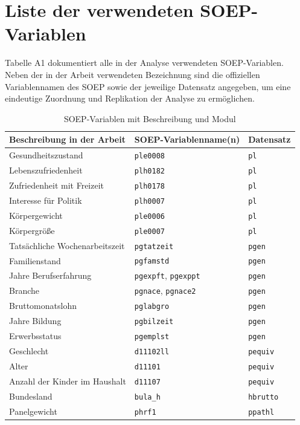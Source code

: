 
\section{Liste der verwendeten SOEP-Variablen}
Tabelle A1 dokumentiert alle in der Analyse verwendeten SOEP-Variablen. Neben der in der Arbeit verwendeten Bezeichnung sind die offiziellen Variablennamen des SOEP sowie der jeweilige Datensatz angegeben, um eine eindeutige Zuordnung und Replikation der Analyse zu ermöglichen.

\begin{table}[h!]
\centering
\caption{SOEP-Variablen mit Beschreibung und Modul}
\begin{tabular}{lll}
\toprule
\textbf{Beschreibung in der Arbeit} & \textbf{SOEP-Variablenname(n)} & \textbf{Datensatz} \\
\midrule
Gesundheitszustand & \texttt{ple0008} & \texttt{pl} \\
Lebenszufriedenheit & \texttt{plh0182} & \texttt{pl} \\
Zufriedenheit mit Freizeit & \texttt{plh0178} & \texttt{pl} \\
Interesse für Politik & \texttt{plh0007} & \texttt{pl} \\
Körpergewicht & \texttt{ple0006} & \texttt{pl} \\
Körpergröße & \texttt{ple0007} & \texttt{pl} \\
\midrule
Tatsächliche Wochenarbeitszeit & \texttt{pgtatzeit} & \texttt{pgen} \\
Familienstand & \texttt{pgfamstd} & \texttt{pgen} \\
Jahre Berufserfahrung & \texttt{pgexpft}, \texttt{pgexppt} & \texttt{pgen} \\
Branche & \texttt{pgnace}, \texttt{pgnace2} & \texttt{pgen} \\
Bruttomonatslohn & \texttt{pglabgro} & \texttt{pgen} \\
Jahre Bildung & \texttt{pgbilzeit} & \texttt{pgen} \\
Erwerbsstatus & \texttt{pgemplst} & \texttt{pgen} \\
\midrule
Geschlecht & \texttt{d11102ll} & \texttt{pequiv} \\
Alter & \texttt{d11101} & \texttt{pequiv} \\
Anzahl der Kinder im Haushalt & \texttt{d11107}  & \texttt{pequiv} \\
\midrule
Bundesland& \texttt{bula\_h} & \texttt{hbrutto} \\
\midrule
Panelgewicht & \texttt{phrf1} & \texttt{ppathl} \\
\bottomrule
\end{tabular}
\end{table}


